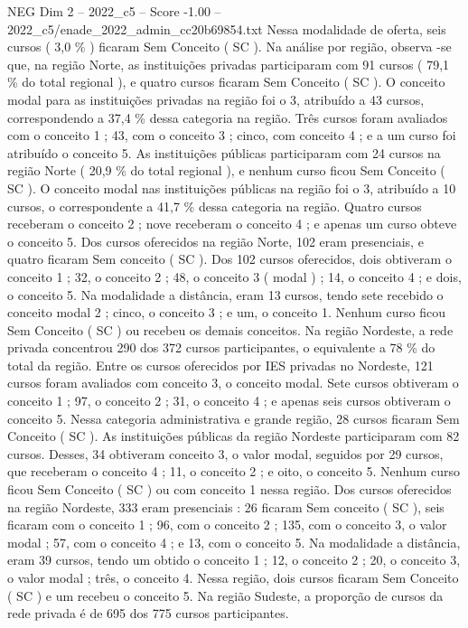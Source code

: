 \begin{textsample}{NEG Dim 2 – 2022\_c5 – Score -1.00 – 2022\_c5/enade\_2022\_admin\_cc20b69854.txt}
Nessa modalidade de oferta, seis cursos ( 3,0 \% ) ficaram Sem Conceito ( SC ).
Na análise por região, observa -se que, na região Norte, as instituições privadas participaram com 91 cursos ( 79,1 \% do total regional ), e quatro cursos ficaram Sem Conceito ( SC ).
O conceito modal para as instituições privadas na região foi o 3, atribuído a 43 cursos, correspondendo a 37,4 \% dessa categoria na região.
Três cursos foram avaliados com o conceito 1 ; 43, com o conceito 3 ; cinco, com conceito 4 ; e a um curso foi atribuído o conceito 5.
As instituições públicas participaram com 24 cursos na região Norte ( 20,9 \% do total regional ), e nenhum curso ficou Sem Conceito ( SC ).
O conceito modal nas instituições públicas na região foi o 3, atribuído a 10 cursos, o correspondente a 41,7 \% dessa categoria na região.
Quatro cursos receberam o conceito 2 ; nove receberam o conceito 4 ; e apenas um curso obteve o conceito 5.
Dos cursos oferecidos na região Norte, 102 eram presenciais, e quatro ficaram Sem conceito ( SC ).
Dos 102 cursos oferecidos, dois obtiveram o conceito 1 ; 32, o conceito 2 ; 48, o conceito 3 ( modal ) ; 14, o conceito 4 ; e dois, o conceito 5.
Na modalidade a distância, eram 13 cursos, tendo sete recebido o conceito modal 2 ; cinco, o conceito 3 ; e um, o conceito 1.
Nenhum curso ficou Sem Conceito ( SC ) ou recebeu os demais conceitos.
Na região Nordeste, a rede privada concentrou 290 dos 372 cursos participantes, o equivalente a 78 \% do total da região.
Entre os cursos oferecidos por IES privadas no Nordeste, 121 cursos foram avaliados com conceito 3, o conceito modal.
Sete cursos obtiveram o conceito 1 ; 97, o conceito 2 ; 31, o conceito 4 ; e apenas seis cursos obtiveram o conceito 5.
Nessa categoria administrativa e grande região, 28 cursos ficaram Sem Conceito ( SC ).
As instituições públicas da região Nordeste participaram com 82 cursos.
Desses, 34 obtiveram conceito 3, o valor modal, seguidos por 29 cursos, que receberam o conceito 4 ; 11, o conceito 2 ; e oito, o conceito 5.
Nenhum curso ficou Sem Conceito ( SC ) ou com conceito 1 nessa região.
Dos cursos oferecidos na região Nordeste, 333 eram presenciais : 26 ficaram Sem conceito ( SC ), seis ficaram com o conceito 1 ; 96, com o conceito 2 ; 135, com o conceito 3, o valor modal ; 57, com o conceito 4 ; e 13, com o conceito 5.
Na modalidade a distância, eram 39 cursos, tendo um obtido o conceito 1 ; 12, o conceito 2 ; 20, o conceito 3, o valor modal ; três, o conceito 4.
Nessa região, dois cursos ficaram Sem Conceito ( SC ) e um recebeu o conceito 5.
Na região Sudeste, a proporção de cursos da rede privada é de 695 dos 775 cursos participantes.

\end{textsample}
